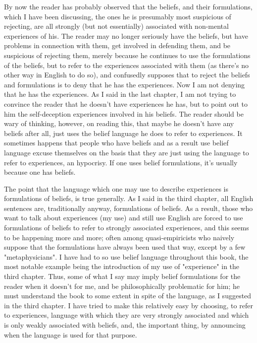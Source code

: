 \documentclass[10pt,twoside,draft]{memoir}
\begin{document}
{By now the reader has probably observed that the beliefs, and their 
formulations, which I have been discussing, the ones he is presumably most 
suspicious of rejecting, are all strongly (but not essentially) associated with 
non-mental experiences of his. The reader may no longer seriously have the 
beliefs, but have problems in connection with them, get involved in 
defending them, and be suspicious of rejecting them, merely because he 
continues to use the formulations of the beliefs, but to refer to the 
experiences associated with them (as there's no other way in English to do 
so), and confusedly supposes that to reject the beliefs and formulations is to 
deny that he has the experiences. Now I am not denying that he has the 
experiences. As I said in the last chapter, I am not trying to convince the 
reader that he doesn't have experiences he has, but to point out to him the 
self-deception experiences involved in his beliefs. The reader should be wary 
of thinking, however, on reading this, that maybe he doesn't have any beliefs 
after all, just uses the belief language he does to refer to experiences. It 
sometimes happens that people who have beliefs and as a result use belief 
language excuse themselves on the basis that they are just using the language 
to refer to experiences, an hypocrisy. If one uses belief formulations, it's 
usually because one has beliefs. 

The point that the language which one may use to describe experiences 
is formulations of beliefs, is true generally. As I said in the third chapter, all 
English sentences are, traditionally anyway, formulations of beliefs. As a 
result, those who want to talk about experiences (my use) and still use 
English are forced to use formulations of beliefs to refer to strongly 
associated experiences, and this seems to be happening more and more; often 
among quasi-empiricists who naively suppose that the formulations have 
always been used that way, except by a few "metaphysicians". I have had to 
so use belief language throughout this book, the most notable example being 
the introduction of my use of "experience" in the third chapter. Thus, some 
of what I say may imply belief formulations for the reader when it doesn't 
for me, and be philosophically problematic for him; he must understand the 
book to some extent in spite of the language, as I suggested in the third 
chapter. I have tried to make this relatively easy by choosing, to refer to 
experiences, language with which they are very strongly associated and 
which is only weakly associated with beliefs, and, the important thing, by 
announcing when the language is used for that purpose. 

}
\end{document}
